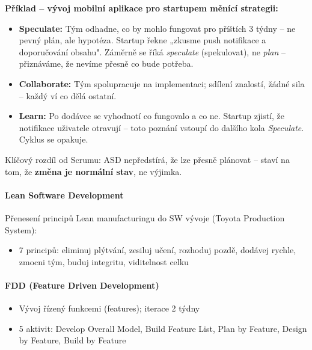 \textbf{Příklad -- vývoj mobilní aplikace pro startupem měnící strategii:}
\begin{itemize}
  \item \textbf{Speculate:} Tým odhadne, co by mohlo fungovat pro příštích 3 týdny -- ne pevný plán, ale hypotéza. Startup řekne „zkusme push notifikace a doporučování obsahu". Záměrně se říká \textit{speculate} (spekulovat), ne \textit{plan} -- přiznáváme, že nevíme přesně co bude potřeba.
  \item \textbf{Collaborate:} Tým spolupracuje na implementaci; sdílení znalostí, žádné sila -- každý ví co dělá ostatní.
  \item \textbf{Learn:} Po dodávce se vyhodnotí co fungovalo a co ne. Startup zjistí, že notifikace uživatele otravují -- toto poznání vstoupí do dalšího kola \textit{Speculate}. Cyklus se opakuje.
\end{itemize}

Klíčový rozdíl od Scrumu: ASD nepředstírá, že lze přesně plánovat -- staví na tom, že \textbf{změna je normální stav}, ne výjimka.

\paragraph{Lean Software Development}
Přenesení principů Lean manufacturingu do SW vývoje (Toyota Production System):
\begin{itemize}
  \item 7 principů: eliminuj plýtvání, zesiluj učení, rozhoduj pozdě, dodávej rychle, zmocni tým, buduj integritu, viditelnost celku
\end{itemize}

\paragraph{FDD (Feature Driven Development)}
\begin{itemize}
  \item Vývoj řízený funkcemi (features); iterace 2 týdny
  \item 5 aktivit: Develop Overall Model, Build Feature List, Plan by Feature, Design by Feature, Build by Feature
\end{itemize}

